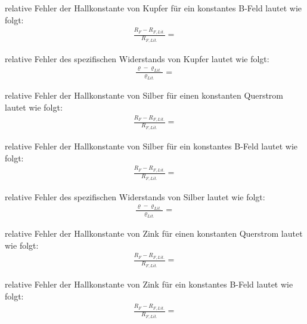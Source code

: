 \justifying relative Fehler der Hallkonstante von Kupfer für ein konstantes B-Feld lautet wie folgt:
\begin{align}
    \frac{R_F - R_{F,Lit.}}{R_{F,Lit.}} = \text{}
\end{align}

\justifying relative Fehler des spezifischen Widerstands von Kupfer lautet wie folgt:
\begin{align}
    \frac{\varrho - \varrho_{Lit.}}{\varrho_{Lit.}} = \text{}
\end{align}


\justifying relative Fehler der Hallkonstante von Silber für einen konstanten Querstrom lautet wie folgt:
\begin{align}
    \frac{R_F - R_{F,Lit.}}{R_{F,Lit.}} = \text{}
\end{align}

\justifying relative Fehler der Hallkonstante von Silber für ein konstantes B-Feld lautet wie folgt:
\begin{align}
    \frac{R_F - R_{F,Lit.}}{R_{F,Lit.}} = \text{}
\end{align}

\justifying relative Fehler des spezifischen Widerstands von Silber lautet wie folgt:
\begin{align}
    \frac{\varrho - \varrho_{Lit.}}{\varrho_{Lit.}} = \text{}
\end{align}


\justifying relative Fehler der Hallkonstante von Zink für einen konstanten Querstrom lautet wie folgt:
\begin{align}
    \frac{R_F - R_{F,Lit.}}{R_{F,Lit.}} = \text{}
\end{align}

\justifying relative Fehler der Hallkonstante von Zink für ein konstantes B-Feld lautet wie folgt:
\begin{align}
    \frac{R_F - R_{F,Lit.}}{R_{F,Lit.}} = \text{}
\end{align}

\newpage
\printbibliography

